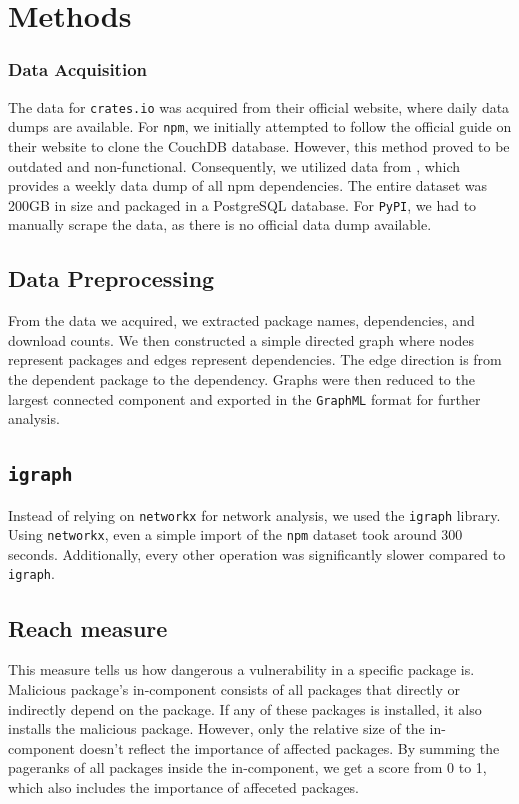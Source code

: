 \documentclass[9pt,twocolumn,twoside]{pnas-report}
\begin{document}
\small

\section*{Methods}


\subsubsection*{Data Acquisition} The data for \texttt{crates.io} was acquired from their official website, where daily data dumps are available.
For \texttt{npm}, we initially attempted to follow the official guide on their website to clone the CouchDB database.
However, this method proved to be outdated and non-functional.
Consequently, we utilized data from \cite{npmdata}, which provides a weekly data dump of all npm dependencies.
The entire dataset was 200GB in size and packaged in a PostgreSQL database.
For \texttt{PyPI}, we had to manually scrape the data, as there is no official data dump available.

\subsection*{Data Preprocessing} From the data we acquired, we extracted package names, dependencies, and download counts. We then constructed a simple directed graph where nodes represent packages and edges represent dependencies. The edge direction is from the dependent package to the dependency. Graphs were then reduced to the largest connected component and exported in the \texttt{GraphML} format for further analysis.

\subsection*{\texttt{igraph}} Instead of relying on \texttt{networkx} for network analysis, we used the \texttt{igraph} library. Using \texttt{networkx}, even a simple import of the \texttt{npm} dataset took around 300 seconds. Additionally, every other operation was significantly slower compared to \texttt{igraph}.

\subsection*{Reach measure}
This measure tells us how dangerous a vulnerability in a specific package is.
Malicious package's in-component consists of all packages that directly or indirectly depend on the package.
If any of these packages is installed, it also installs the malicious package.
However, only the relative size of the in-component doesn't reflect the importance of affected packages.
By summing the pageranks of all packages inside the in-component, we get a score from 0 to 1, which also includes the importance of affeceted packages.
\end{document}
